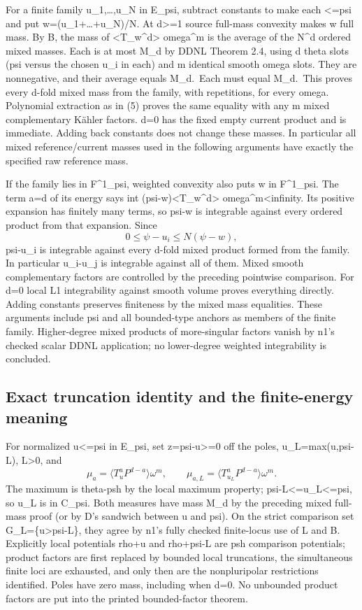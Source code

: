 \documentclass[
]{article}
\begin{document}
For a finite family u\_1,\ldots,u\_N in E\_psi, subtract constants to
make each \textless=psi and put w=(u\_1+\ldots+u\_N)/N. At
d\textgreater=1 source full-mass convexity makes w full mass. By B, the
mass of \textless T\_w\^{}d\textgreater{} omega\^{}m is the average of
the N\^{}d ordered mixed masses. Each is at most M\_d by DDNL Theorem
2.4, using d theta slots (psi versus the chosen u\_i in each) and m
identical smooth omega slots. They are nonnegative, and their average
equals M\_d.~Each must equal M\_d.~This proves every d-fold mixed mass
from the family, with repetitions, for every omega. Polynomial
extraction as in (5) proves the same equality with any m mixed
complementary Kähler factors. d=0 has the fixed empty current product
and is immediate. Adding back constants does not change these masses. In
particular all mixed reference/current masses used in the following
arguments have exactly the specified raw reference mass.

If the family lies in F\^{}1\_psi, weighted convexity also puts w in
F\^{}1\_psi. The term a=d of its energy says int
(psi-w)\textless T\_w\^{}d\textgreater{} omega\^{}m\textless infinity.
Its positive expansion has finitely many terms, so psi-w is integrable
against every ordered product from that expansion. Since \[
0\leq\psi-u_i\leq N(\psi-w),
\] psi-u\_i is integrable against every d-fold mixed product formed from
the family. In particular \textbar u\_i-u\_j\textbar{} is integrable
against all of them. Mixed smooth complementary factors are controlled
by the preceding pointwise comparison. For d=0 local L1 integrability
against smooth volume proves everything directly. Adding constants
preserves finiteness by the mixed mass equalities. These arguments
include psi and all bounded-type anchors as members of the finite
family. Higher-degree mixed products of more-singular factors vanish by
n1's checked scalar DDNL application; no lower-degree weighted
integrability is concluded.

\subsection{Exact truncation identity and the finite-energy
meaning}\label{exact-truncation-identity-and-the-finite-energy-meaning}

For normalized u\textless=psi in E\_psi, set z=psi-u\textgreater=0 off
the poles, u\_L=max(u,psi-L), L\textgreater0, and \[
\mu_a=\langle T_u^aP^{d-a}\rangle\omega^m,\qquad
\mu_{a,L}=\langle T_{u_L}^aP^{d-a}\rangle\omega^m.
\] The maximum is theta-psh by the local maximum property;
psi-L\textless=u\_L\textless=psi, so u\_L is in C\_psi. Both measures
have mass M\_d by the preceding mixed full-mass proof (or by D's
sandwich between u and psi). On the strict comparison set
G\_L=\{u\textgreater psi-L\}, they agree by n1's fully checked
finite-locus use of L and B. Explicitly local potentials rho+u and
rho+psi-L are psh comparison potentials; product factors are first
replaced by bounded local truncations, the simultaneous finite loci are
exhausted, and only then are the nonpluripolar restrictions identified.
Poles have zero mass, including when d=0. No unbounded product factors
are put into the printed bounded-factor theorem.
\end{document}
